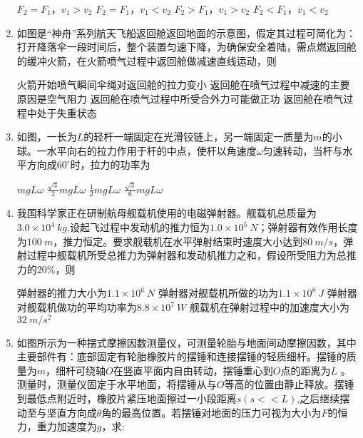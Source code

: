 \begin{enumerate}[leftmargin=0em]
\fourchoices
{$ F_2=F_1 $，$ v_{1} > v_{2} $ }
{$ F_2=F_1 $，$ v_{1} < v_{2} $}
{$ F_2>F_1 $，$ v_{1} > v_{2} $}
{$ F_2<F_1 $，$ v_{1} < v_{2} $}




\item 
{}
如图是“神舟”系列航天飞船返回舱返回地面的示意图，假定其过程可简化为：打开降落伞一段时间后，整个装置匀速下降，为确保安全着陆，需点燃返回舱的缓冲火箭，在火箭喷气过程中返回舱做减速直线运动，则  
\begin{figure}[h!]
\centering

\end{figure}

\fourchoices
{火箭开始喷气瞬间伞绳对返回舱的拉力变小}
{返回舱在喷气过程中减速的主要原因是空气阻力}
{返回舱在喷气过程中所受合外力可能做正功}
{返回舱在喷气过程中处于失重状态}


\item
{}
如图，一长为$ L $的轻杆一端固定在光滑铰链上，另一端固定一质量为$ m $的小球。一水平向右的拉力作用于杆的中点，使杆以角速度$ \omega $匀速转动，当杆与水平方向成$ 60 ^{ \circ } $时，拉力的功率为  
\begin{figure}[h!]
\centering

\end{figure}

\fourchoices
{$ mgL \omega $}
{$ \frac{\sqrt{3}}{2} mgL \omega $}
{$ \frac{ 1 }{ 2 } mgL \omega $}
{$ \frac{\sqrt{3}}{6} mgL \omega $}


\item 
{}
我国科学家正在研制航母舰载机使用的电磁弹射器。舰载机总质量为$ 3.0 \times 10^4 \ kg $,设起飞过程中发动机的推力恒为$ 1.0 \times 10^5 \ N $；弹射器有效作用长度为$ 100 \ m $，推力恒定。要求舰载机在水平弹射结束时速度大小达到$ 80 \ m/s $，弹射过程中舰载机所受总推力为弹射器和发动机推力之和，假设所受阻力为总推力的$ 20 \% $，则  

\fourchoices
{弹射器的推力大小为$ 1.1 \times 10^6 \ N $}
{弹射器对舰载机所做的功为$ 1.1 \times 10^8 \ J $}
{弹射器对舰载机做功的平均功率为$ 8.8 \times 10^7 \ W $}
{舰载机在弹射过程中的加速度大小为$ 32 \ m/s^{2} $}





\newpage
\item
{}
如图所示为一种摆式摩擦因数测量仪，可测量轮胎与地面间动摩擦因数，其中主要部件有：底部固定有轮胎橡胶片的摆锤和连接摆锤的轻质细杆。摆锤的质量为$ m $，细杆可绕轴$ O $在竖直平面内自由转动，摆锤重心到$ O $点的距离为$ L $ 。测量时，测量仪固定于水平地面，将摆锤从与$ O $等高的位置由静止释放。摆锤到最低点附近时，橡胶片紧压地面擦过一小段距离$ s(s<<L) $,之后继续摆动至与坚直方向成$ \theta $角的最高位置。若摆锤对地面的压力可视为大小为$ F $的恒力，重力加速度为$ g $，求:


\end{enumerate}
